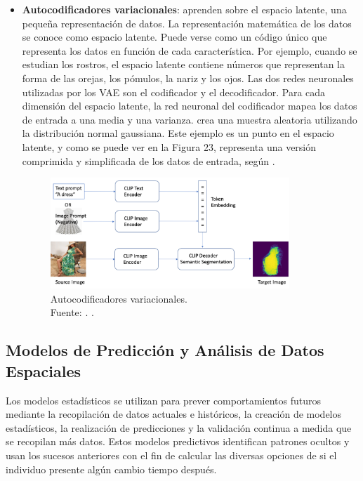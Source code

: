 \begin{itemize}
	\item \textbf{Autocodificadores variacionales}: aprenden sobre el espacio latente, una pequeña representación de datos. La representación matemática de los datos se conoce como espacio latente. Puede verse como un código único que representa los datos en función de cada característica. Por ejemplo, cuando se estudian los rostros, el espacio latente contiene números que representan la forma de las orejas, los pómulos, la nariz y los ojos. Las dos redes neuronales utilizadas por los VAE son el codificador y el decodificador. Para cada dimensión del espacio latente, la red neuronal del codificador mapea los datos de entrada a una media y una varianza. crea una muestra aleatoria utilizando la distribución normal gaussiana. Este ejemplo es un punto en el espacio latente, y como se puede ver en la Figura 23, representa una versión comprimida y simplificada de los datos de entrada, según \parencite{tec_amaz2023iagen}.
	
	\begin{figure}[!ht]
		\begin{center}
			\includegraphics[width=0.85\textwidth]{2/figures/autocodificadoresvariacionales.png}
			\caption[Autocodificadores variacionales]{Autocodificadores variacionales.\\
			Fuente: \cite{tec_amaz2023iagen}. .}
			\label{2:fig9}
		\end{center}
	\end{figure}
\end{itemize}


\subsection{Modelos de Predicción y Análisis de Datos Espaciales}

Los modelos estadísticos se utilizan para prever comportamientos futuros mediante la recopilación de datos actuales e históricos, la creación de modelos estadísticos, la realización de predicciones y la validación continua a medida que se recopilan más datos. Estos modelos predictivos identifican patrones ocultos y usan los sucesos anteriores con el fin de calcular las diversas opciones de si el individuo presente algún cambio tiempo después. \parencite{gl_gartner2019pm}

